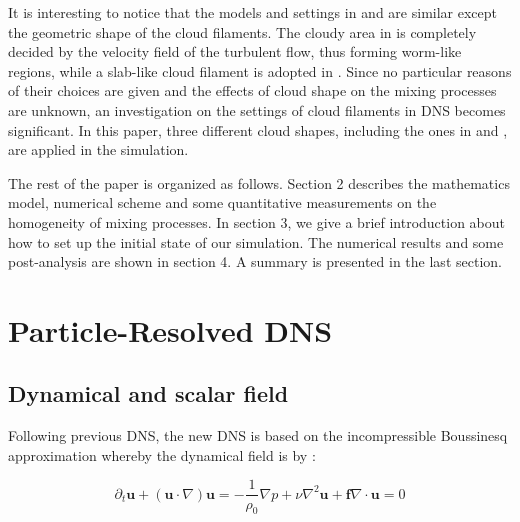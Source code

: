 \documentclass[12pt]{article}
\begin{document}
It is interesting to notice that the models and settings in \cite{Kumar12} and \cite{And04} are similar except the geometric shape of the cloud filaments. The cloudy area in \cite{And04} is completely decided by the velocity field of the turbulent flow, thus forming worm-like regions, while a slab-like cloud filament is adopted in \cite{Kumar11}. Since no particular reasons of their choices are given and the effects of cloud shape on the mixing processes are unknown, an investigation on the settings of cloud filaments in DNS becomes significant. In this paper, three different cloud shapes, including the ones in \cite{Kumar11} and \cite{And04}, are applied in the simulation.

The rest of the paper is organized as follows. Section 2 describes
the mathematics model, numerical scheme and some quantitative measurements on 
the homogeneity of mixing processes. In section 3, we give
a brief introduction about how to set up the initial state of our
simulation. The numerical results and some post-analysis are shown
in section 4. A summary is presented in the last section. 
\section{Particle-Resolved DNS}


\subsection{Dynamical and scalar field}

Following previous DNS, the new DNS is based on the incompressible
Boussinesq approximation whereby the dynamical field is by \cite{And04}:

\begin{subequations}

\begin{equation}
\partial_{t}\mathbf{u}+(\mathbf{u}\cdot\nabla)\mathbf{u}=-\frac{1}{\rho_{0}}\nabla p+\nu\nabla^2 \mathbf{u}+\mathbf{f}\label{eq:NS1}
\end{equation}


\begin{equation}
\nabla\cdot \mathbf{u}=0\label{eq:NS2}
\end{equation}

\end{subequations}
\end{document}
